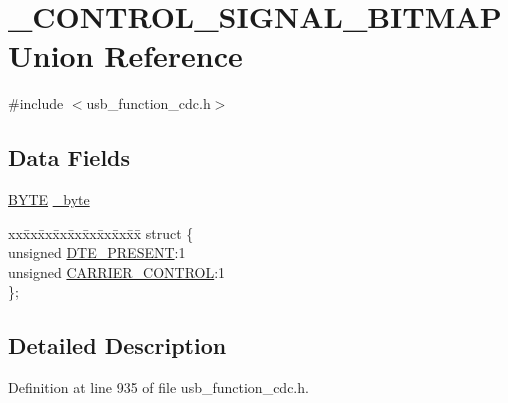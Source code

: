 \hypertarget{union___c_o_n_t_r_o_l___s_i_g_n_a_l___b_i_t_m_a_p}{}\section{\+\_\+\+C\+O\+N\+T\+R\+O\+L\+\_\+\+S\+I\+G\+N\+A\+L\+\_\+\+B\+I\+T\+M\+A\+P Union Reference}
\label{union___c_o_n_t_r_o_l___s_i_g_n_a_l___b_i_t_m_a_p}


{\ttfamily \#include $<$usb\+\_\+function\+\_\+cdc.\+h$>$}

\subsection*{Data Fields}
\begin{DoxyCompactItemize}
\item 
\hyperlink{_generic_type_defs_8h_a4ae1dab0fb4b072a66584546209e7d58}{B\+Y\+T\+E} \hyperlink{union___c_o_n_t_r_o_l___s_i_g_n_a_l___b_i_t_m_a_p_aad6b25752650539bbd15773c4b71b4d4}{\+\_\+byte}
\item 
\begin{tabbing}
xx\=xx\=xx\=xx\=xx\=xx\=xx\=xx\=xx\=\kill
struct \{\\
\>unsigned \hyperlink{union___c_o_n_t_r_o_l___s_i_g_n_a_l___b_i_t_m_a_p_abd62ba5a2ebbfe1cf985381168371760}{DTE\_PRESENT}:1\\
\>unsigned \hyperlink{union___c_o_n_t_r_o_l___s_i_g_n_a_l___b_i_t_m_a_p_a289dfd86f16d9b6a29432803e55d2236}{CARRIER\_CONTROL}:1\\
\}; \\

\end{tabbing}\end{DoxyCompactItemize}


\subsection{Detailed Description}


Definition at line 935 of file usb\+\_\+function\+\_\+cdc.\+h.




